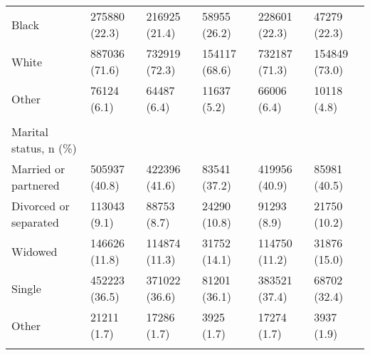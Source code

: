 \begin{adjustbox}{width={\textwidth},totalheight={\textheight},keepaspectratio,frame}
{\begin{tabular}{L{20em}C{10em}C{10em}C{10em}C{10em}C{10em}}
\hspace{3mm}               Black &      275880 (22.3) &                 216925 (21.4) &              58955 (26.2) &                  228601 (22.3) &              47279 (22.3) \\
\hspace{3mm}               White &      887036 (71.6) &                 732919 (72.3) &             154117 (68.6) &                  732187 (71.3) &             154849 (73.0) \\
\hspace{3mm}               Other &        76124 (6.1) &                   64487 (6.4) &               11637 (5.2) &                    66006 (6.4) &               10118 (4.8) \\
&                 &                            &                        &                             &                        \\
Marital status, n (\%) &                 &                            &                        &                             &                        \\
\hspace{3mm}      Married or partnered &      505937 (40.8) &                 422396 (41.6) &              83541 (37.2) &                  419956 (40.9) &              85981 (40.5) \\
\hspace{3mm}     Divorced or separated &       113043 (9.1) &                   88753 (8.7) &              24290 (10.8) &                    91293 (8.9) &              21750 (10.2) \\
\hspace{3mm}                   Widowed &      146626 (11.8) &                 114874 (11.3) &              31752 (14.1) &                  114750 (11.2) &              31876 (15.0) \\
\hspace{3mm}                    Single &      452223 (36.5) &                 371022 (36.6) &              81201 (36.1) &                  383521 (37.4) &              68702 (32.4) \\
\hspace{3mm}                     Other &        21211 (1.7) &                   17286 (1.7) &                3925 (1.7) &                    17274 (1.7) &                3937 (1.9) \\
&                 &                            &                        &                             &                        \\

\end{tabular}}
\end{adjustbox}
